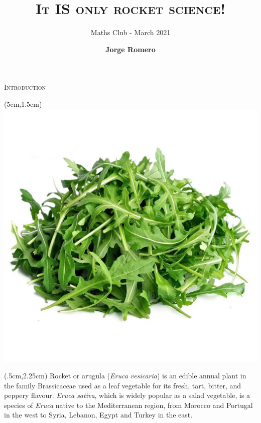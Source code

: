 \documentclass[9pt]{beamer}
\title{\textsc{It IS only rocket science!}}
\subtitle{Maths Club - March 2021}
\author{\textbf{Jorge Romero}}
\institute{University of Liverpool, Jyväskylän Yliopisto}
\begin{document}
\titlepage


\begin{frame}{\textsc{Introduction}}
\begin{textblock*}{7.5cm}(5cm,1.5cm)
\includegraphics[scale=0.8]{assets/fresh-rocket-leaf-500x500.jpg}
\end{textblock*}

\begin{textblock*}{4cm}(.5cm,2.25cm)
Rocket or arugula (\textit{Eruca vesicaria}) is an edible annual plant in the family Brassicaceae used as a leaf vegetable for its fresh, tart, bitter, and peppery flavour. \textit{Eruca sativa}, which is widely popular as a salad vegetable, is a species of \textit{Eruca} native to the Mediterranean region, from Morocco and Portugal in the west to Syria, Lebanon, Egypt and Turkey in the east.
\end{textblock*}
\end{frame}
\end{document}
